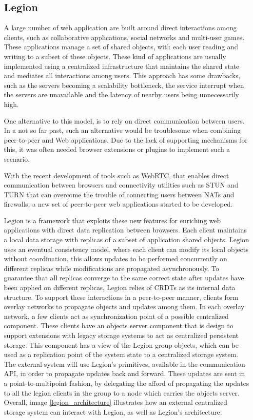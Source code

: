 \subsection{Legion}
\label{sec:legion_intro}
A large number of web application are built around direct interactions among clients, such as collaborative applications, social networks and multi-user games. These applications manage a set of shared objects, with each user reading and writing to a subset of these objects. These kind of applications are usually implemented using a centralized infrastructure that maintains the shared state and mediates all interactions among users. This approach has some drawbacks, such as the servers becoming a scalability bottleneck, the service interrupt when the servers are unavailable and the latency of nearby users being unnecessarily high.\par
	One alternative to this model, is to rely on direct communication between users. In a not so far past, such an alternative would be troublesome when combining peer-to-peer and Web applications. Due to the lack of supporting mechanisms for this, it was often needed browser extensions or plugins to implement such a scenario.\par
	With the recent development of tools such as WebRTC, that enables direct communication between browsers and connectivity utilities such as STUN and TURN that can overcome the trouble of connecting users between NATs and firewalls, a new set of peer-to-peer web applications started to be developed.\par
	Legion is a framework that exploits these new features for enriching web applications with direct data replication between browsers. Each client maintains a local data storage with replicas of a subset of application shared objects. Legion uses an eventual consistency model, where each client can modify its local objects without coordination, this allows updates to be performed concurrently on different replicas while modifications are propagated asynchronously. To guarantee that all replicas converge to the same correct state after updates have been applied on different replicas, Legion relies of CRDTs as its internal data structure. To support these interactions in a peer-to-peer manner, clients form overlay networks to propagate objects and updates among them. In each overlay network, a few clients act as synchronization point of a possible centralized component. These clients have an objects server component that is design to support extensions with legacy storage systems to act as centralized persistent storage. This component has a view of the Legion group objects, which can be used as a replication point of the system state to a centralized storage system. The external system will use Legion's primitives, available in the communication API, in order to propagate updates back and forward. These updates are sent in a point-to-multipoint fashion, by delegating the afford of propagating the updates to all the legion clients in the group to a node which carries the objects server. Overall, image \ref{legion_architecture} illustrates how an external centralized storage system can interact with Legion, as well as Legion's architecture.

